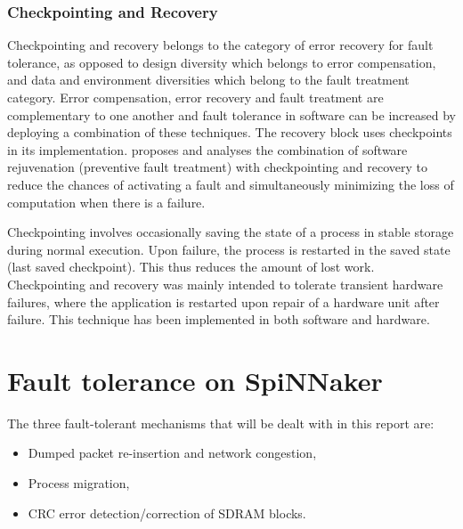 \documentclass[a4paper, 11pt]{article}
\begin{document}

\subsubsection{Checkpointing and Recovery}
Checkpointing and recovery \citep{kulkarni1990effects} belongs to the category of error recovery for fault tolerance, as opposed to design diversity which belongs to error compensation, and data and environment diversities which belong to the fault treatment category. Error compensation, error recovery and fault treatment are complementary to one another and fault tolerance in software can be increased by deploying a combination of these techniques. The recovery block uses checkpoints in its implementation. \citet{garg1996minimizing} proposes and analyses the combination of software rejuvenation (preventive fault treatment) with checkpointing and recovery to reduce the chances of activating a fault and simultaneously minimizing the loss of computation when there is a failure.

Checkpointing involves occasionally saving the state of a process in stable storage during normal execution. Upon failure, the process is restarted in the saved state (last saved checkpoint). This thus reduces the amount of lost work. Checkpointing and recovery was mainly intended to tolerate transient hardware failures, where the application is restarted upon repair of a hardware unit after failure. This technique has been implemented in both software and hardware.


\clearpage
\section{Fault tolerance on SpiNNaker}
The three fault-tolerant mechanisms that will be dealt with in this report are:
\begin{itemize}
\item Dumped packet re-insertion and network congestion,
\item Process migration,
\item CRC error detection/correction of SDRAM blocks.
\end{itemize}
\end{document}
